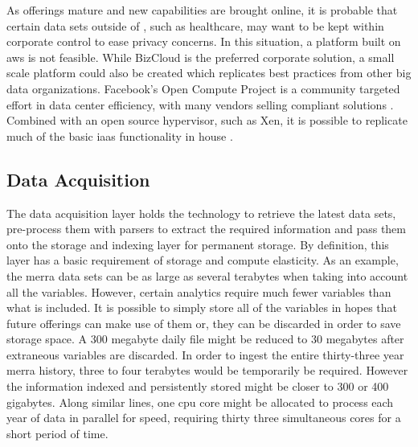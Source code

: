As offerings mature and new capabilities are brought online, it is probable that certain data sets outside of \climatedge, such as healthcare, may want to be kept within corporate control to ease privacy concerns. In this situation, a platform built on \gls{aws} is not feasible. While BizCloud is the preferred corporate solution, a small scale platform could also be created which replicates best practices from other big data organizations. Facebook's Open Compute Project is a community targeted effort in data center efficiency, with many vendors selling compliant solutions \cite{opencompute}. Combined with an open source hypervisor, such as Xen, it is possible to replicate much of the basic \gls{iaas} functionality in house \cite{xen}.
\subsection{Data Acquisition}
The data acquisition layer holds the technology to retrieve the latest data sets, pre-process them with parsers  to extract the required information and pass them onto the storage and indexing layer for permanent storage. By definition, this layer has a basic requirement of storage and compute elasticity. As an example, the \gls{merra} data sets can be as large as several terabytes when taking into account all the variables. However, certain analytics require much fewer variables than what is included. It is possible to simply store all of the variables in hopes that future offerings can make use of them or, they can be discarded in order to save storage space. A 300 megabyte daily file might be reduced to 30 megabytes after extraneous variables are discarded.  In order to ingest the entire thirty-three year \gls{merra} history, three to four terabytes would be temporarily be required. However the information indexed and persistently stored might be closer to 300 or 400 gigabytes. Along similar lines, one \gls{cpu} core might be allocated to process each year of data in parallel for speed, requiring thirty three simultaneous cores for a short period of time. \\

